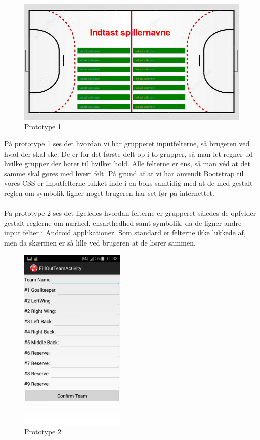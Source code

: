 \begin{figure}[ht!]
\centering
\includegraphics[width=150mm]{images/begin}
\caption{Prototype 1}
\end{figure}
På prototype 1 ses det hvordan vi har grupperet inputfelterne, så brugeren ved hvad der skal ske. De er for det første delt op i to grupper, så man let regner ud hvilke grupper der hører til hvilket hold. Alle felterne er ens, så man véd at det samme skal gøres med hvert felt. På grund af at vi har anvendt Bootstrap til vores CSS er inputfelterne lukket inde i en boks samtidig med at de med gestalt reglen om symbolik ligner noget brugeren har set før på internettet.\\\\

\newpage
På prototype 2 ses det ligeledes hvordan felterne er grupperet således de opfylder gestalt reglerne om nærhed, ensarthedhed samt symbolik, da de ligner andre input felter i Android applikationer. Som standard er felterne ikke lukkede af, men da skærmen er så lille ved brugeren at de hører sammen.
\begin{figure}[ht!]
\centering
\includegraphics[width=50mm]{images/prototype2}
\caption{Prototype 2}
\end{figure}

